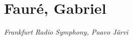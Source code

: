 \chapter{Faur\'{e}, Gabriel}
\label{cha:faure}


  \textit{Frankfurt Radio Symphony, Paavo J\"{a}rvi} 



